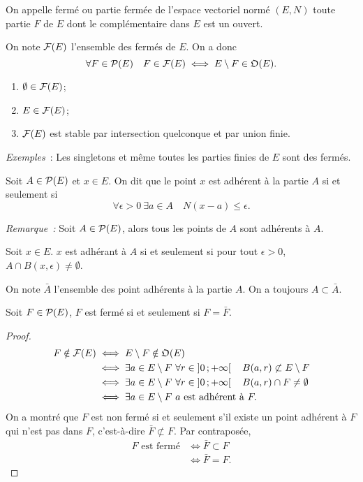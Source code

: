 \begin{defdef}
  On appelle fermé ou partie fermée de l'espace vectoriel normé \((E, N)\) toute partie \(F\) de \(E\) dont le complémentaire dans \(E\) est un ouvert.

  On note \(\F(E)\) l'ensemble des fermés de \(E\). On a donc
  \begin{equation}
    \forall F \in \P(E) \quad F \in \F(E) \iff E\setminus F \in \Oouvert(E).
  \end{equation}
\end{defdef}
\begin{prop}
  \begin{enumerate}
  \item \(\emptyset \in \F(E)\);
  \item \(E \in \F(E)\);
  \item \(\F(E)\) est stable par intersection quelconque et par union finie.
  \end{enumerate}
\end{prop}
%
\emph{Exemples}~: Les singletons et même toutes les parties finies de \(E\) sont des fermés.
%
\begin{defdef}
  Soit \(A \in \P(E)\) et \(x \in E\). On dit que le point \(x\) est adhérent à la partie \(A\) si et seulement si
  \begin{equation}
    \forall \epsilon>0 \ \exists a \in A \quad N(x-a) \leqslant \epsilon.
  \end{equation}
\end{defdef}
\emph{Remarque~:} Soit \(A \in \P(E)\), alors tous les points de \(A\) sont adhérents à \(A\).
\begin{defdef}
  Soit \(x \in E\). \(x\) est adhérant à \(A\) si et seulement si pour tout \(\epsilon>0\), \(A \cap B(x, \epsilon) \neq \emptyset\).
\end{defdef}

On note \(\bar{A}\) l'ensemble des point adhérents à la partie \(A\). On a toujours \(A \subset \bar{A}\).

\begin{prop}
  Soit \(F \in \P(E)\), \(F\) est fermé si et seulement si \(F=\bar{F}\).
\end{prop}
\begin{proof}
  \begin{align}
    F \notin \F(E) &\iff E\setminus F \notin \Oouvert(E) \\
    &\iff \exists a \in E\setminus F \ \forall r \in \Rplusetoile \quad B(a, r) \not\subset E\setminus F \\
    &\iff \exists a \in E\setminus F \ \forall r \in \Rplusetoile \quad B(a, r) \cap F \neq \emptyset \\
    &\iff \exists a \in E\setminus F \ a \text{~est adhérent à~} F.
  \end{align}
  On a montré que \(F\) est non fermé si et seulement s'il existe un point adhérent à \(F\) qui n'est pas dans \(F\), c'est-à-dire \(\bar{F} \not\subset F\). Par contraposée,
  \begin{align}
    F \text{~est fermé} &\iff \bar{F} \subset F \\
    &\iff \bar{F}=F.
  \end{align}
\end{proof}

